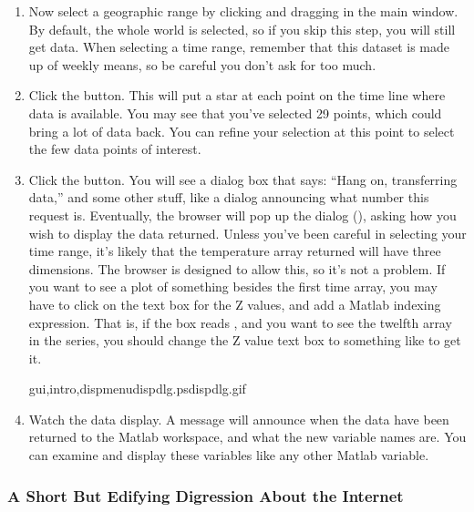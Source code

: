 \begin{enumerate}
  
\item Now select a geographic range by clicking and dragging in the
  main window. By default, the whole world is selected, so if you skip
  this step, you will still get data.  When selecting a time range,
  remember that this dataset is made up of weekly means, so be careful
  you don't ask for too much.
  
\item Click the  button.  This will put a star at
  each point on the time line where data is available.  You may see
  that you've selected 29 points, which could bring a lot of data
  back.  You can refine your selection at this point to select the few
  data points of interest.
  
\item Click the  button. You will see a dialog box that
  says: ``Hang on, transferring data,'' and some other stuff, like a
  dialog announcing what number this request is.
  Eventually, the browser will pop up the  dialog
  (), asking how you wish to display the
  data returned.  Unless you've been careful in
  selecting your time range, it's likely that the temperature array
  returned will have three dimensions.  The browser is designed to
  allow this, so it's not a problem.  If you want to see a plot of
  something besides the first time array, you may have to
  click on the text box for the Z values, and add a Matlab indexing
  expression.  That is, if the box reads , and you want to
  see the twelfth array in the series, you should change
  the Z value text box to something like  to get it.

{gui,intro,dispmenu}{dispdlg.ps}{dispdlg.gif}{}
  
\item Watch the data display. A message will announce when the data
  have been returned to the Matlab workspace, and what the new
  variable names are. You can examine and display these variables like
  any other Matlab variable.

\end{enumerate}

\subsubsection{A Short But Edifying Digression About the Internet}
\label{gui,intro,loaddods}

